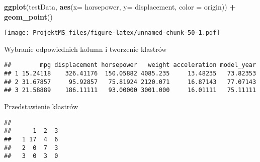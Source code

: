 \documentclass[
]{article}
\newenvironment{Shaded}{\begin{snugshade}}{\end{snugshade}}
\newcommand{\CommentTok}[1]{\textcolor[rgb]{0.56,0.35,0.01}{\textit{#1}}}
\newcommand{\DataTypeTok}[1]{\textcolor[rgb]{0.13,0.29,0.53}{#1}}
\newcommand{\DecValTok}[1]{\textcolor[rgb]{0.00,0.00,0.81}{#1}}
\newcommand{\KeywordTok}[1]{\textcolor[rgb]{0.13,0.29,0.53}{\textbf{#1}}}
\newcommand{\NormalTok}[1]{#1}
\newcommand{\OperatorTok}[1]{\textcolor[rgb]{0.81,0.36,0.00}{\textbf{#1}}}
\newcommand{\StringTok}[1]{\textcolor[rgb]{0.31,0.60,0.02}{#1}}
\begin{document}
\begin{Shaded}
\begin{Highlighting}[]
\KeywordTok{ggplot}\NormalTok{(testData, }\KeywordTok{aes}\NormalTok{(}\DataTypeTok{x=}\NormalTok{ horsepower, }\DataTypeTok{y=}\NormalTok{ displacement, }\DataTypeTok{color =}\NormalTok{ origin)) }\OperatorTok{+}\StringTok{ }\KeywordTok{geom_point}\NormalTok{()}
\end{Highlighting}
\end{Shaded}

\texttt{[image: ProjektMS\_files/figure-latex/unnamed-chunk-50-1.pdf]}

Wybranie odpowiednich kolumn i tworzenie klastrów

\begin{Shaded}
\end{Shaded}

\begin{verbatim}
##        mpg displacement horsepower   weight acceleration model_year
## 1 15.24118    326.41176  150.05882 4085.235     13.48235   73.82353
## 2 31.67857     95.92857   75.81924 2120.071     16.87143   77.07143
## 3 21.58889    186.11111   93.00000 3001.000     16.01111   75.11111
\end{verbatim}

Przedstawienie klastrów

\begin{Shaded}
\end{Shaded}

\begin{verbatim}
##    
##      1  2  3
##   1 17  4  6
##   2  0  7  3
##   3  0  3  0
\end{verbatim}
\end{document}
